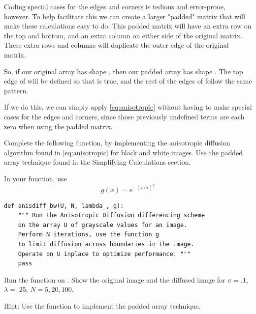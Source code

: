Coding special cases for the edges and corners is tedious and error-prone, however.
To help facilitate this we can create a larger "padded" matrix that will make these calculations easy to do.
This padded matrix will have an extra row on the top and bottom, and an extra column on either side of the original matrix.
These extra rows and columns will duplicate the outer edge of the original matrix.

So, if our original array  has shape , then our padded array  has shape .
The top edge of  will be defined so that  is true, and the rest of the edges of  follow the same pattern.

If we do this, we can simply apply \eqref{eq:anisotropic} without having to make special cases for the edges and corners, since those previously undefined terms are each zero when using the padded matrix.

\begin{problem}
\label{prob:anisdiff_bw}
Complete the following function, by implementing the anisotropic diffusion algorithm found in \ref{eq:anisotropic} for black and white images.
Use the padded array technique found in the Simplifying Calculations section.


In your function, use
\[g(x) = e^{-\left(x/\sigma\right)^2}\]

\begin{lstlisting}
def anisdiff_bw(U, N, lambda_, g):
    """ Run the Anisotropic Diffusion differencing scheme
    on the array U of grayscale values for an image.
    Perform N iterations, use the function g
    to limit diffusion across boundaries in the image.
    Operate on U inplace to optimize performance. """
    pass
\end{lstlisting}
Run the function on .
Show the original image and the diffused image for $\sigma = .1$, $\lambda = .25$, $N = 5, 20, 100$.

Hint: Use the  function to implement the padded array technique.
\end{problem}

